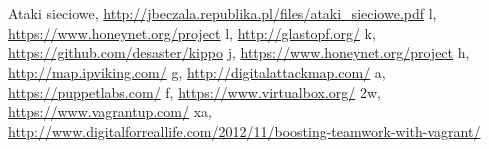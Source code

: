 \documentclass[runningheads,a4paper]{llncs}
\begin{document}
\section{}
\begin{thebibliography}{1}


\bibitem{} Ataki sieciowe,
\url{http://jbeczala.republika.pl/files/ataki_sieciowe.pdf}
 l, \url{https://www.honeynet.org/project}
\bibitem{} l,
\url{http://glastopf.org/}
\bibitem{} k,
\url{https://github.com/desaster/kippo}
\bibitem{} j,
\url{https://www.honeynet.org/project}
\bibitem{} h,
\url{http://map.ipviking.com/}
\bibitem{} g,
\url{http://digitalattackmap.com/}
\bibitem{} a,
\url{https://puppetlabs.com/}
\bibitem{} f,
\url{https://www.virtualbox.org/}
\bibitem{} 2w,
\url{https://www.vagrantup.com/}
\bibitem{} xa,
\url{http://www.digitalforreallife.com/2012/11/boosting-teamwork-with-vagrant/}


\end{thebibliography}
\end{document}
